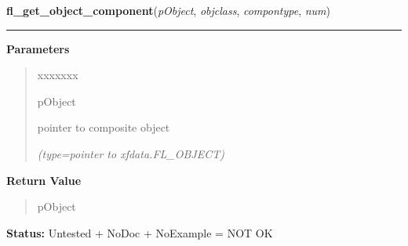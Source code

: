 \hspace{.8\funcindent}\begin{boxedminipage}{\funcwidth}

    \raggedright \textbf{fl\_get\_object\_component}(\textit{pObject}, \textit{objclass}, \textit{compontype}, \textit{num})

    \vspace{-1.5ex}

    \rule{\textwidth}{0.5\fboxrule}
\setlength{\parskip}{2ex}
\setlength{\parskip}{1ex}
      \textbf{Parameters}
      \vspace{-1ex}

      \begin{quote}
        \begin{Ventry}{xxxxxxx}

          \item[pObject]

          pointer to composite object

            {\it (type=pointer to xfdata.FL\_OBJECT)}

        \end{Ventry}

      \end{quote}

      \textbf{Return Value}
    \vspace{-1ex}

      \begin{quote}
      pObject

      \end{quote}

\textbf{Status:} Untested + NoDoc + NoExample = NOT OK



    \end{boxedminipage}

    \label{xformslib:library:fl_for_all_objects}

    \vspace{0.5ex}


